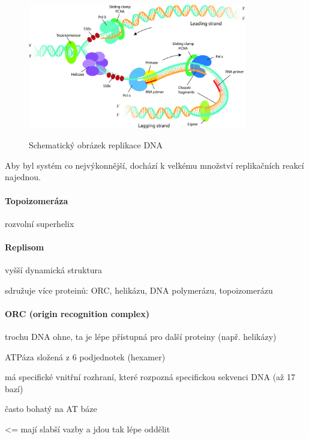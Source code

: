 \documentclass[DIV=8]{scrreprt}
\begin{document}
\begin{figure}
    \caption{Schematický obrázek replikace DNA}
    \includegraphics[width=0.85\textwidth]{replication.jpg}
    \centering
    \label{}
\end{figure}


Aby byl systém co nejvýkonnější, dochází k velkému množství replikačních reakcí najednou.

\paragraph{Topoizomeráza}
\begin{myItemize}[nosep]
    \item rozvolní superhelix
\end{myItemize}



\paragraph{Replisom}
\begin{myItemize}[nosep]
    \item vyšší dynamická struktura
    \item sdružuje více proteinů: ORC, helikázu, DNA polymerázu, topoizomerázu
\end{myItemize}



\paragraph{ORC (origin recognition complex)}
\begin{myItemize}[nosep]
    \item trochu DNA ohne, ta je lépe přístupná pro další proteiny (např. helikázy)
    \item ATPáza složená z 6 podjednotek (hexamer)
    \item má specifické vnitřní rozhraní, které rozpozná specifickou sekvenci DNA (až 17 bazí)
    \item často bohatý na AT báze
\begin{myItemize}[nosep]
    \item <= mají slabší vazby a jdou tak lépe oddělit
\end{myItemize}

\end{myItemize}
\end{document}
